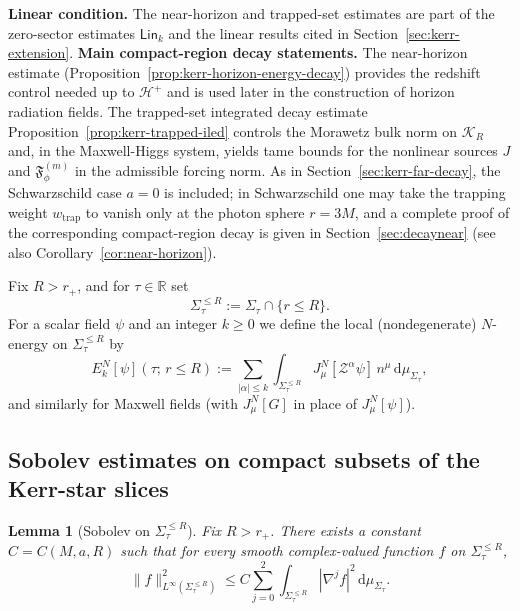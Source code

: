 \documentclass[11pt]{article}
\numberwithin{equation}{section}
\theoremstyle{plain}
\newtheorem{lemma}[theorem]{Lemma}
\theoremstyle{definition}
\theoremstyle{remark}
\newcommand{\dd}{\mathrm{d}}
\newcommand{\Lin}{\mathsf{Lin}}
\begin{document}
\noindent\textbf{Linear condition.} The near-horizon and trapped-set estimates are part of the zero-sector estimates $\Lin_{k}$ and the linear results cited in Section~\ref{sec:kerr-extension}.
\medskip
\noindent\textbf{Main compact-region decay statements.}
The near-horizon estimate (Proposition~\ref*{prop:kerr-horizon-energy-decay}) provides the redshift control needed up to $\mathcal H^{+}$ and is used later in the construction of horizon radiation fields. The trapped-set integrated decay estimate Proposition~\ref{prop:kerr-trapped-iled} controls the Morawetz bulk norm on $\mathcal K_{R}$ and, in the Maxwell-Higgs system, yields tame bounds for the nonlinear sources $J$ and $\mathfrak F_{\phi}^{(m)}$ in the admissible forcing norm. As in Section~\ref{sec:kerr-far-decay}, the Schwarzschild case $a=0$ is included; in Schwarzschild one may take the trapping weight $w_{\mathrm{trap}}$ to vanish only at the photon sphere $r=3M$, and a complete proof of the corresponding compact-region decay is given in Section~\ref{sec:decaynear} (see also Corollary~\ref{cor:near-horizon}).
\medskip

Fix $R>r_{+}$, and for $\tau\in\mathbb R$ set
\begin{equation}
\Sigma_{\tau}^{\le R}:=\Sigma_{\tau}\cap\{r\le R\}.
\end{equation}
For a scalar field $\psi$ and an integer $k\ge0$ we define the local (nondegenerate) $N$-energy on $\Sigma_{\tau}^{\le R}$ by
\begin{equation}\label{eq:kerr-local-energy}
E^{N}_{k}[\psi](\tau;\,r\le R)
:=
\sum_{|\alpha|\le k}\int_{\Sigma_{\tau}^{\le R}} J^{N}_{\mu}[\mathcal Z^{\alpha}\psi]\,n^{\mu}\,\dd\mu_{\Sigma_{\tau}},
\end{equation}
and similarly for Maxwell fields (with $J^{N}_{\mu}[G]$ in place of $J^{N}_{\mu}[\psi]$).

\subsection{Sobolev estimates on compact subsets of the Kerr-star slices}\label{subsec:kerr-compact-sobolev}

\begin{lemma}[Sobolev on $\Sigma_{\tau}^{\le R}$]\label{lem:kerr-sobolev-compact}
Fix $R>r_{+}$.
There exists a constant $C=C(M,a,R)$ such that for every smooth complex-valued function $f$ on $\Sigma_{\tau}^{\le R}$,
\begin{equation}\label{eq:kerr-sobolev-compact}
\|f\|_{L^{\infty}(\Sigma_{\tau}^{\le R})}^{2}
\le
C\sum_{j=0}^{2}\int_{\Sigma_{\tau}^{\le R}}|\nabla^{j}f|^{2}\,\dd\mu_{\Sigma_{\tau}}.
\end{equation}
\end{lemma}
\end{document}

